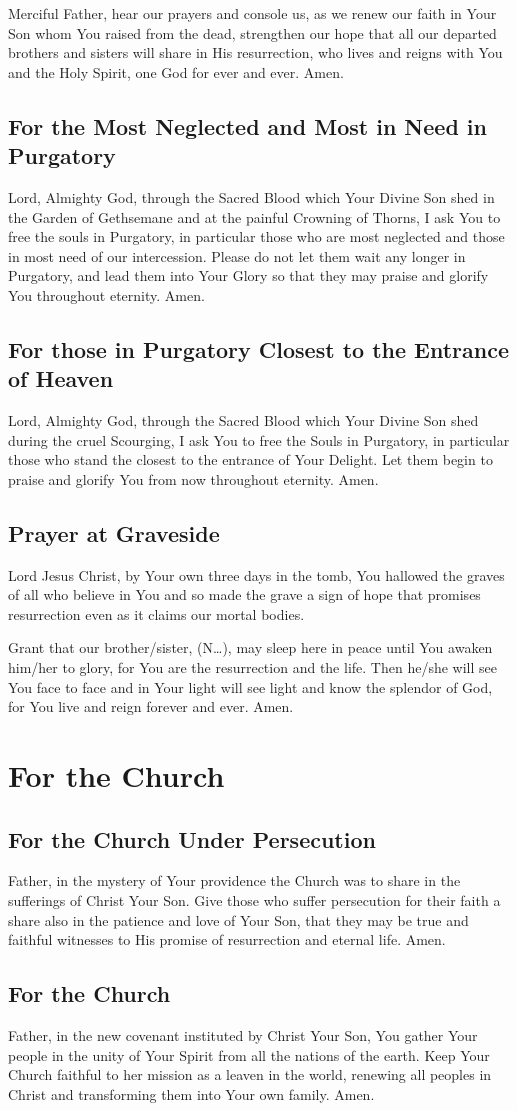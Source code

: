 \documentclass[12pt]{article}
\newcommand{\prayersection}[1]{\section{#1}}
\newcommand{\prayertitle}[1]{\subsection{#1}}
\newcommand{\insertname}{(N\dots)}
\begin{document}
Merciful Father, hear our prayers and console us, as we renew our faith in Your Son whom You raised from the dead, strengthen our hope that all our departed brothers and sisters will share in His resurrection, who lives and reigns with You and the Holy Spirit, one God for ever and ever.
Amen.

\prayertitle{For the Most Neglected and Most in Need in Purgatory}
\label{prayer:most_neglected_purgatory}
Lord, Almighty God, through the Sacred Blood which Your Divine Son shed in the Garden of Gethsemane and at the painful Crowning of Thorns, I ask You to free the souls in Purgatory, in particular those who are most neglected and those in most need of our intercession.
Please do not let them wait any longer in Purgatory, and lead them into Your Glory so that they may praise and glorify You throughout eternity.
Amen.

\prayertitle{For those in Purgatory Closest to the Entrance of Heaven}
\label{prayer:purgatory_closest_heaven}
Lord, Almighty God, through the Sacred Blood which Your Divine Son shed during the cruel Scourging, I ask You to free the Souls in Purgatory, in particular those who stand the closest to the entrance of Your Delight.
Let them begin to praise and glorify You from now throughout eternity.
Amen.

\prayertitle{Prayer at Graveside}
\label{prayer:graveside}
Lord Jesus Christ, by Your own three days in the tomb, You hallowed the graves of all who believe in You and so made the grave a sign of hope that promises resurrection even as it claims our mortal bodies.

Grant that our brother/sister, \insertname, may sleep here in peace until You awaken him/her to glory, for You are the resurrection and the life.
Then he/she will see You face to face and in Your light will see light and know the splendor of God, for You live and reign forever and ever.
Amen.

\newpage

\prayersection{For the Church}
\prayertitle{For the Church Under Persecution}
Father, in the mystery of Your providence the Church was to share in the sufferings of Christ Your Son.
Give those who suffer persecution for their faith a share also in the patience and love of Your Son, that they may be true and faithful witnesses to His promise of resurrection and eternal life.
Amen.

\prayertitle{For the Church}
Father, in the new covenant instituted by Christ Your Son, You gather Your people in the unity of Your Spirit from all the nations of the earth.
Keep Your Church faithful to her mission as a leaven in the world, renewing all peoples in Christ and transforming them into Your own family.
Amen.
\end{document}

